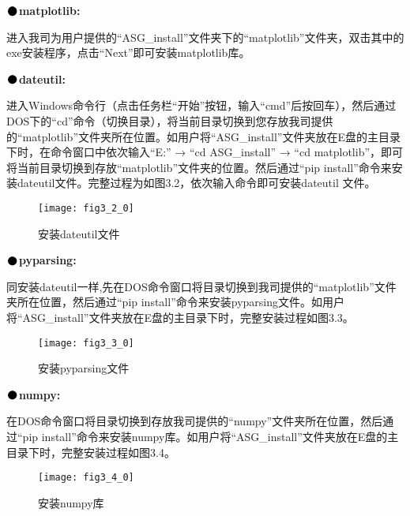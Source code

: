\noindent$\vcenter{\hbox{\huge$\bullet$}}$\quad\fontsize{12pt}{\baselineskip}\textbf{matplotlib:}

进入我司为用户提供的“ASG\_install”文件夹下的“matplotlib”文件夹，双击其中的exe安装程序，点击“Next”即可安装matplotlib库。%
\vspace{0.3cm}

\noindent$\vcenter{\hbox{\huge$\bullet$}}$\quad\fontsize{12pt}{\baselineskip}\textbf{dateutil:}

进入Windows命令行（点击任务栏“开始”按钮，输入“cmd”后按回车），然后通过DOS下的“cd”命令（切换目录），将当前目录切换到您存放我司提供的“matplotlib”文件夹所在位置。如用户将“ASG\_install”文件夹放在E盘的主目录下时，在命令窗口中依次输入“E:” → “cd ASG\_install” → “cd matplotlib”，即可将当前目录切换到存放“matplotlib”文件夹的位置。然后通过“pip install”命令来安装dateutil文件。完整过程为如图3.2，依次输入命令即可安装dateutil 文件。
\begin{figure}[ht]
\centering
\texttt{[image: fig3\_2\_0]}
\caption{安装dateutil文件}
\end{figure}

\newpage
\noindent$\vcenter{\hbox{\huge$\bullet$}}$\quad\fontsize{12pt}{\baselineskip}\textbf{pyparsing:}

同安装dateutil一样,先在DOS命令窗口将目录切换到我司提供的“matplotlib”文件夹所在位置，然后通过“pip install”命令来安装pyparsing文件。如用户将“ASG\_install”文件夹放在E盘的主目录下时，完整安装过程如图3.3。


\begin{figure}[H]
\centering
\texttt{[image: fig3\_3\_0]}
\caption{安装pyparsing文件}
\end{figure}

\noindent$\vcenter{\hbox{\huge$\bullet$}}$\quad\fontsize{12pt}{\baselineskip}\textbf{numpy:}

在DOS命令窗口将目录切换到存放我司提供的“numpy”文件夹所在位置，然后通过“pip install”命令来安装numpy库。如用户将“ASG\_install”文件夹放在E盘的主目录下时，完整安装过程如图3.4。
\begin{figure}[H]
\centering
\texttt{[image: fig3\_4\_0]}
\caption{安装numpy库}
\end{figure}

